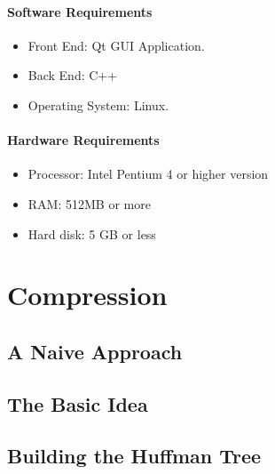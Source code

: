 \documentclass[12pt]{report}
\begin{document}
\subsubsection{Software Requirements}
\begin{itemize}

\item{	Front End: Qt GUI Application.}
\item{	Back End: C++}
\item{	Operating System: Linux.}

\end{itemize}

\subsubsection{Hardware Requirements}
\begin{itemize}
\item{Processor: Intel Pentium 4 or higher version}
\item{RAM: 512MB or more}
\item{Hard disk: 5 GB or less}
\end{itemize}

%
\pagestyle{fancy}
\chead{}
\rfoot{\small{\thepage}}
\renewcommand{\headrulewidth}{0.4pt}
\renewcommand{\footrulewidth}{0.4pt}
\chapter{Compression}



\section{A Naive Approach}

\begin{figure}[h!]
	\centering
\end{figure}

\section{The Basic Idea}


\section{Building the Huffman Tree}
\end{document}
